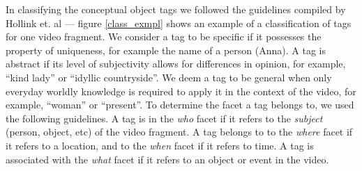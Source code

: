 In classifying the conceptual object tags we followed the guidelines compiled
by Hollink et. al \cite{laurapaper} --- figure \ref{class_exmpl} shows an
example of a classification of tags for one video fragment. We consider a tag
to be specific if it possesses the property of uniqueness, for example the
name of a person (Anna). A tag is abstract if its level of subjectivity allows
for differences in opinion, for example, ``kind lady'' or ``idyllic
countryside''. We deem a tag to be general when only everyday worldly
knowledge is required to apply it in the context of the video, for example,
``woman'' or ``present''. To determine the facet a tag belongs to, we used the
following guidelines. A tag is in the \textit{who} facet if it refers to the
\textit{subject} (person, object, etc) of the video fragment. A tag belongs to
to the \textit{where} facet if it refers to a location, and to the
\textit{when} facet if it refers to time. A tag is associated with the
\textit{what} facet if it refers to an object or event in the video.

